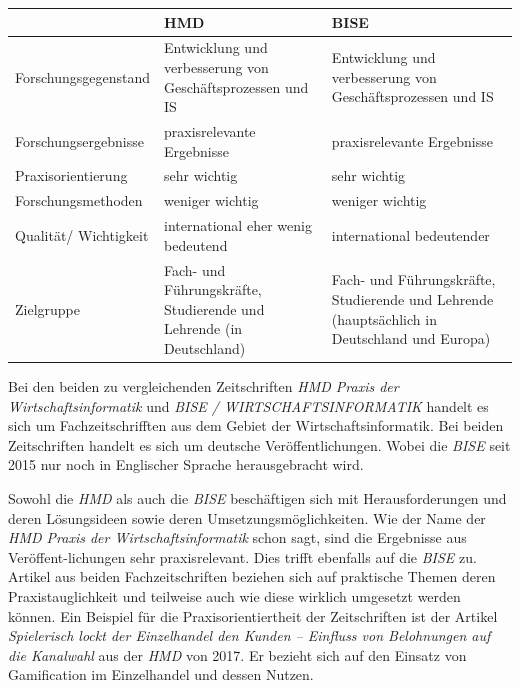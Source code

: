 \documentclass[12pt,utf8]{scrartcl}
\begin{document}
\begin{tabular}{|p{4cm}|p{5.5cm}|p{5.5cm}|}
\hline
& HMD & BISE \\
\hline
Forschungsgegenstand & Entwicklung und verbesserung von Geschäftsprozessen und IS & Entwicklung und verbesserung von Geschäftsprozessen und IS \\
\hline
Forschungsergebnisse & praxisrelevante Ergebnisse & praxisrelevante Ergebnisse \\
\hline
Praxisorientierung & sehr wichtig & sehr wichtig \\
\hline
Forschungsmethoden & weniger wichtig & weniger wichtig \\
\hline
Qualität/ Wichtigkeit & international eher wenig bedeutend & international bedeutender \\
\hline
Zielgruppe & Fach- und Führungskräfte, Studierende und Lehrende (in Deutschland) & Fach- und Führungskräfte, Studierende und Lehrende (hauptsächlich in Deutschland und Europa) \\
\hline
\end{tabular}
\newline
\newline
\newline

Bei den beiden zu vergleichenden Zeitschriften \emph{HMD Praxis der Wirtschaftsinformatik} und \emph{BISE / WIRTSCHAFTSINFORMATIK} handelt es sich um Fachzeitschrifften aus dem Gebiet der Wirtschaftsinformatik. Bei beiden Zeitschriften handelt es sich um deutsche Veröffentlichungen. Wobei die \emph{BISE} seit 2015 nur noch in Englischer Sprache herausgebracht wird\cite{BISE}.

Sowohl die \emph{HMD} als auch die \emph{BISE} beschäftigen sich mit Herausforderungen und deren Lösungsideen sowie deren Umsetzungsmöglichkeiten\cite{Meier2017}\cite{Stein2017}\cite{Ebert2017}. Wie der Name der \emph{HMD Praxis der Wirtschaftsinformatik} schon sagt, sind die Ergebnisse aus Veröffent-lichungen sehr praxisrelevant. Dies trifft ebenfalls auf die \emph{BISE} zu. Artikel aus beiden Fachzeitschriften beziehen sich auf praktische Themen deren Praxistauglichkeit und teilweise auch wie diese wirklich umgesetzt werden können\cite{Meier2017}\cite{Stein2017}\cite{Ebert2017}\cite{Kakar2017}. Ein Beispiel für die Praxisorientiertheit der Zeitschriften ist der Artikel \emph{Spielerisch lockt der Einzelhandel den Kunden – Einfluss von Belohnungen auf die Kanalwahl}\cite{Stein2017} aus der \emph{HMD} von 2017. Er bezieht sich auf den Einsatz von Gamification im Einzelhandel und dessen Nutzen. 
\end{document}
